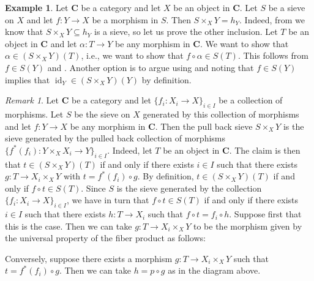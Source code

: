 \documentclass[12pt,reqno,a4paper]{amsart}
\theoremstyle{plain}
\theoremstyle{definition}
\newtheorem{exmp}[thm]{Example}
\theoremstyle{remark}
\newtheorem{rem}[thm]{Remark}
\begin{document}
\begin{exmp}\label{exmp:pullbacksieve}
  Let $\mathbf{C}$ be a category and let $X$ be an object in $\mathbf{C}$.
  Let $S$ be a sieve on $X$ and let $f \colon Y \to X$ be a morphism in $S$.
  Then $S \times_{X} Y = h_{Y}$.
  Indeed, from  we know that $S \times_{X} Y \subseteq h_{Y}$ is a sieve, so let us prove the other inclusion.
  Let $T$ be an object in $\mathbf{C}$ and let $\alpha \colon T \to Y$ be any morphism in $\mathbf{C}$.
  We want to show that $\alpha \in (S \times_{X} Y)(T)$, i.e., we want to show that $f \circ \alpha \in S(T)$.
  This follows from $f \in S(Y)$ and .
  Another option is to argue using  and noting that $f \in S(Y)$ implies that $\operatorname{id}_{Y} \in (S \times_{X} Y)(Y)$ by definition.
\end{exmp}

\begin{rem}\label{rem:pullback}
  Let $\mathbf{C}$ be a category and let $\{ f_{i} \colon X_{i} \to X \}_{i \in I}$ be a collection of morphisms.
  Let $S$ be the sieve on $X$ generated by this collection of morphisms and let $f \colon Y \to X$ be any morphism in $\mathbf{C}$.
  Then the pull back sieve $S \times_{X} Y$ is the sieve generated by the pulled back collection of morphisms $\{ f^{*}(f_{i}) \colon Y \times_{X} X_{i} \to Y \}_{i \in I}$.
  Indeed, let $T$ be an object in $\mathbf{C}$.
  The claim is then that $t \in (S \times_{X} Y)(T)$ if and only if there exists $i \in I$ such that there exists $g \colon T \to X_{i} \times_{X} Y$ with $t = f^{*}(f_{i}) \circ g$.
  By definition, $t \in (S \times_{X} Y)(T)$ if and only if $f \circ t \in S(T)$.
  Since $S$ is the sieve generated by the collection $\{f_{i} \colon X_{i} \to X \}_{i \in I}$, we have in turn that $f \circ t \in S(T)$ if and only if there exists $i \in I$ such that there exists $h \colon T \to X_{i}$ such that $f \circ t = f_{i} \circ h$.
  Suppose first that this is the case.
  Then we can take $g \colon T \to X_{i} \times_{X} Y$ to be the morphism given by the universal property of the fiber product as follows:
  \begin{center}
  \end{center}
  Conversely, suppose there exists a morphism $g \colon T \to X_{i} \times_{X} Y$ such that $t = f^{*}(f_{i}) \circ g$.
  Then we can take $h = p \circ g$ as in the diagram above.
\end{rem}
\end{document}

